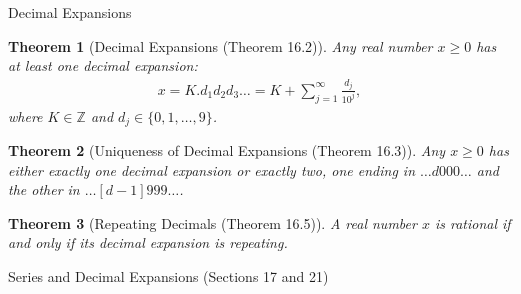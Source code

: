 \documentclass[7pt]{article}
\theoremstyle{definition}
\theoremstyle{plain}
\newtheorem{theorem}{Theorem}
\begin{document}


{Decimal Expansions}
\begin{theorem}[Decimal Expansions (Theorem 16.2)]
Any real number $ x \geq 0 $ has at least one decimal expansion:
\begin{align}
x = K.d_1d_2d_3\ldots = K + \sum_{j=1}^\infty \frac{d_j}{10^j},
\end{align}
where $ K \in \mathbb{Z} $ and $ d_j \in \{0, 1, \ldots, 9\} $.
\end{theorem}

\begin{theorem}[Uniqueness of Decimal Expansions (Theorem 16.3)]
Any $ x \geq 0 $ has either exactly one decimal expansion or exactly two, one ending in $ \ldots d000\ldots $ and the other in $ \ldots [d-1]999\ldots $.
\end{theorem}

\begin{theorem}[Repeating Decimals (Theorem 16.5)]
A real number $ x $ is rational if and only if its decimal expansion is repeating.
\end{theorem}
{Series and Decimal Expansions (Sections 17 and 21)}
\end{document}
